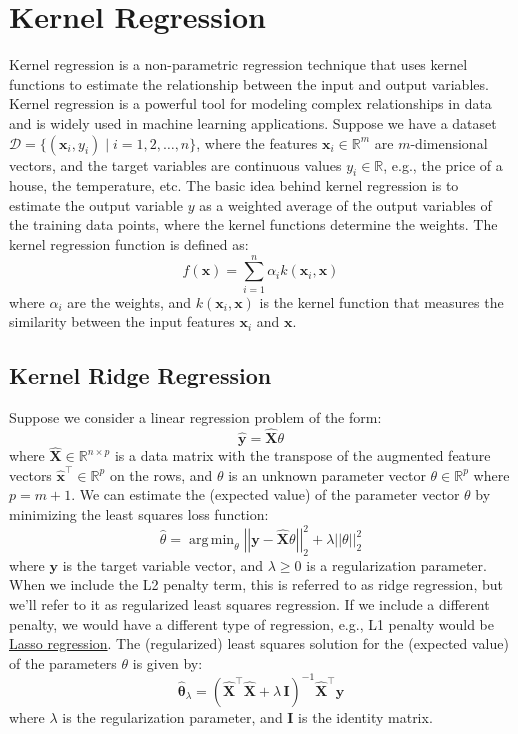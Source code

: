 \documentclass{article}[11pt]
\def\R{\mathbb{R}}
\def\D{\mathcal{D}}
\newcommand{\norm}[1]{\left|\left|#1\right|\right|}
\DeclareMathOperator*{\argmin}{arg\,min}
\begin{document}
\section{Kernel Regression}
Kernel regression is a non-parametric regression technique that uses kernel functions to estimate the relationship between the input and output variables.
Kernel regression is a powerful tool for modeling complex relationships in data and is widely used in machine learning applications.
Suppose we have a dataset $\D = \{(\mathbf{x}_{i},y_{i}) \mid i = 1,2,\dots,n\}$, where the features $\mathbf{x}_i \in \mathbb{R}^{m}$ 
are $m$-dimensional vectors, and the target variables are continuous values $y_i \in\R $, e.g., the price of a house, the temperature, etc.
The basic idea behind kernel regression is to estimate the output variable $y$ as a weighted average of the output variables of the training data points, 
where the kernel functions determine the weights. The kernel regression function is defined as:
\begin{equation}
f(\mathbf{x}) = \sum_{i=1}^{n} \alpha_i k(\mathbf{x}_i, \mathbf{x})
\end{equation}
where $\alpha_i$ are the weights, and $k(\mathbf{x}_i, \mathbf{x})$ is the kernel function that measures the similarity between the input features $\mathbf{x}_i$ and $\mathbf{x}$.

\subsection{Kernel Ridge Regression}
Suppose we consider a linear regression problem of the form:
\begin{equation}
\hat{\mathbf{y}} = \hat{\mathbf{X}}\theta
\end{equation}
where $\hat{\mathbf{X}}\in\R^{n\times{p}}$ is a data matrix with the transpose of the augmented feature vectors $\hat{\mathbf{x}}^{\top}\in\R^{p}$ on the rows, and $\theta$ is an unknown parameter vector $\theta\in\mathbb{R}^{p}$ 
where $p = m+1$. We can estimate the (expected value) of the parameter vector $\theta$ by minimizing the least squares loss function:
\begin{equation}
\hat{\theta} = \argmin_{\theta} \norm{\mathbf{y} - \hat{\mathbf{X}}\theta}_{2}^{2} + \lambda\norm{\theta}_{2}^{2}
\end{equation}
where $\mathbf{y}$ is the target variable vector, and $\lambda\geq{0}$ is a regularization parameter. 
When we include the L2 penalty term, this is referred to as ridge regression, but we'll refer to it as regularized least squares regression.
If we include a different penalty, we would have a different type of regression, e.g., L1 penalty would be \href{https://en.wikipedia.org/wiki/Lasso_(statistics)}{Lasso regression}.
The (regularized) least squares solution for the (expected value) of the parameters $\theta$ is given by:
\begin{equation}\label{eq:ridge-solution}
\hat{\mathbf{\theta}}_{\lambda} = \left(\hat{\mathbf{X}}^{\top}\hat{\mathbf{X}}+\lambda\,\mathbf{I}\right)^{-1}\hat{\mathbf{X}}^{\top}\mathbf{y}
\end{equation}
where $\lambda$ is the regularization parameter, and $\mathbf{I}$ is the identity matrix.
\end{document}
